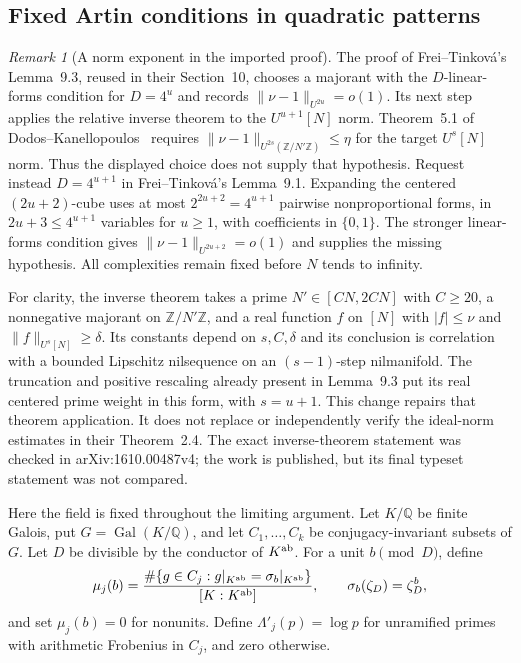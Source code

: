 \documentclass[11pt]{article}
\theoremstyle{definition}
\theoremstyle{remark}
\newtheorem{remark}[theorem]{Remark}
\begin{document}
\subsection{Fixed Artin conditions in quadratic patterns}
\label{subsec:v5-artin-transfer}

\begin{remark}[A norm exponent in the imported proof]
\label{rem:v5-ft-norm-repair}
The proof of Frei--Tinkov\'a's Lemma~9.3, reused in their Section~10,
chooses a majorant with the $D$-linear-forms condition for $D=4^u$ and
records $\|\nu-1\|_{U^{2u}}=o(1)$. Its next step applies the relative
inverse theorem to the $U^{u+1}[N]$ norm. Theorem~5.1 of
Dodos--Kanellopoulos~\cite{v5dk} requires
$\|\nu-1\|_{U^{2s}(\mathbb Z/N'\mathbb Z)}\leq\eta$ for the target
$U^s[N]$ norm. Thus the displayed choice does not supply that hypothesis.
Request instead $D=4^{u+1}$ in Frei--Tinkov\'a's Lemma~9.1. Expanding the
centered $(2u+2)$-cube uses at most $2^{2u+2}=4^{u+1}$ pairwise
nonproportional forms, in $2u+3\leq4^{u+1}$ variables for $u\geq1$,
with coefficients in $\{0,1\}$. The stronger linear-forms condition gives
$\|\nu-1\|_{U^{2u+2}}=o(1)$ and supplies the missing hypothesis.
All complexities remain fixed before $N$ tends to infinity.

For clarity, the inverse theorem takes a prime $N'\in[CN,2CN]$ with
$C\geq20$, a nonnegative majorant on $\mathbb Z/N'\mathbb Z$, and a real
function $f$ on $[N]$ with $|f|\leq\nu$ and $\|f\|_{U^s[N]}\geq\delta$.
Its constants depend on $s,C,\delta$ and its conclusion is correlation
with a bounded Lipschitz nilsequence on an $(s-1)$-step nilmanifold.
The truncation and positive rescaling already present in Lemma~9.3
put its real centered prime weight in this form, with $s=u+1$.
This change repairs that theorem application. It does not replace or
independently verify the ideal-norm estimates in their Theorem~2.4.
The exact inverse-theorem statement was checked in arXiv:1610.00487v4;
the work is published, but its final typeset statement was not compared.
\end{remark}

Here the field is fixed throughout the limiting argument. Let $K/\mathbb Q$
be finite Galois, put $G=\operatorname{Gal}(K/\mathbb Q)$, and let
$C_1,\ldots,C_k$ be conjugacy-invariant subsets of $G$.
Let $D$ be divisible by the conductor of $K^{\rm ab}$.
For a unit $b\pmod D$, define
\begin{equation}\label{eq:v5-mu}
 \mu_j(b)=\frac{\#\{g\in C_j:g|_{K^{\rm ab}}=\sigma_b|_{K^{\rm ab}}\}}
                  {[K:K^{\rm ab}]},
 \qquad \sigma_b(\zeta_D)=\zeta_D^b,
\end{equation}
and set $\mu_j(b)=0$ for nonunits. Define $\Lambda'_j(p)=\log p$ for
unramified primes with arithmetic Frobenius in $C_j$, and zero otherwise.
\end{document}
